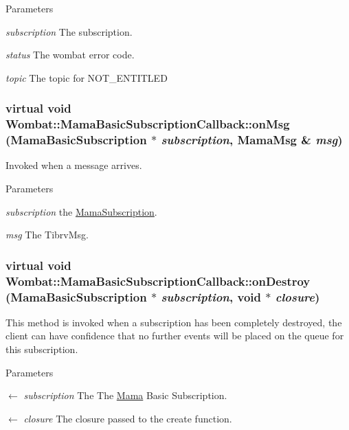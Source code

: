 \begin{DoxyParams}{Parameters}
\item[{\em subscription}]The subscription. \item[{\em status}]The wombat error code. \item[{\em topic}]The topic for NOT\_\-ENTITLED \end{DoxyParams}
\hypertarget{classWombat_1_1MamaBasicSubscriptionCallback_a60c045b907deccf84d0398d6501d31d2}{
\subsubsection[{onMsg}]{\setlength{\rightskip}{0pt plus 5cm}virtual void Wombat::MamaBasicSubscriptionCallback::onMsg ({\bf MamaBasicSubscription} $\ast$ {\em subscription}, \/  {\bf MamaMsg} \& {\em msg})}}
\label{classWombat_1_1MamaBasicSubscriptionCallback_a60c045b907deccf84d0398d6501d31d2}


Invoked when a message arrives. 
\begin{DoxyParams}{Parameters}
\item[{\em subscription}]the {\ttfamily \hyperlink{classWombat_1_1MamaSubscription}{MamaSubscription}}. \item[{\em msg}]The TibrvMsg. \end{DoxyParams}
\hypertarget{classWombat_1_1MamaBasicSubscriptionCallback_a9d6ab2f4870df2245d295d61fa204473}{
\subsubsection[{onDestroy}]{\setlength{\rightskip}{0pt plus 5cm}virtual void Wombat::MamaBasicSubscriptionCallback::onDestroy ({\bf MamaBasicSubscription} $\ast$ {\em subscription}, \/  void $\ast$ {\em closure})}}
\label{classWombat_1_1MamaBasicSubscriptionCallback_a9d6ab2f4870df2245d295d61fa204473}


This method is invoked when a subscription has been completely destroyed, the client can have confidence that no further events will be placed on the queue for this subscription. 
\begin{DoxyParams}{Parameters}
\item[\mbox{$\leftarrow$} {\em subscription}]The The \hyperlink{classWombat_1_1Mama}{Mama} Basic Subscription. \item[\mbox{$\leftarrow$} {\em closure}]The closure passed to the create function. \end{DoxyParams}
